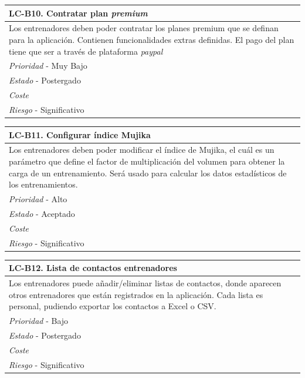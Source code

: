 	\begin{center}
		\begin{tabularx}{15cm}{|X|}
			\hline 
				\bf{LC-B10. Contratar plan \it{premium}}\\
			\hline
				Los entrenadores deben poder contratar los planes premium que se definan para la aplicación. Contienen funcionalidades extras definidas. El pago del plan tiene que ser a través de plataforma \it{paypal}\\
			\hline
				{\it Prioridad} - Muy Bajo\\
			\hline
				{\it Estado} - Postergado\\
			\hline
				{\it Coste}\\
			\hline
				{\it Riesgo} - Significativo\\
			\hline
		\end{tabularx}
	\end{center}
	
	\begin{center}
		\begin{tabularx}{15cm}{|X|}
			\hline 
				\bf{LC-B11. Configurar índice Mujika}\\
			\hline
				Los entrenadores deben poder modificar el índice de Mujika, el cuál es un parámetro que define el factor de multiplicación del volumen para obtener la carga de un entrenamiento. Será usado para calcular los datos estadísticos de los entrenamientos.\\
			\hline
				{\it Prioridad} - Alto\\
			\hline
				{\it Estado} - Aceptado\\
			\hline
				{\it Coste}\\
			\hline
				{\it Riesgo} - Significativo\\
			\hline
		\end{tabularx}
	\end{center}
	
	\begin{center}
		\begin{tabularx}{15cm}{|X|}
			\hline 
				\bf{LC-B12. Lista de contactos entrenadores}\\
			\hline
				Los entrenadores puede añadir/eliminar listas de contactos, donde aparecen otros entrenadores que están registrados en la aplicación. Cada lista es personal, pudiendo exportar los contactos a Excel o CSV.\\
			\hline
				{\it Prioridad} - Bajo\\
			\hline
				{\it Estado} - Postergado\\
			\hline
				{\it Coste}\\
			\hline
				{\it Riesgo} - Significativo\\
			\hline
		\end{tabularx}
	\end{center}
	
